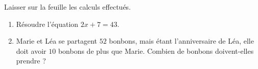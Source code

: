 
\begin{exercice}\label{exo2smath-0304}

    Laisser sur la feuille les calculs effectués.
    \begin{enumerate}
        \item
            Résoudre l'équation \( 2x+7=43\).
        \item
            Marie et Léa se partagent \( 52\) bonbons, mais étant l'anniversaire de Léa, elle doit avoir \( 10\) bonbons de plus que Marie. Combien de bonbons doivent-elles prendre ?
    \end{enumerate}

\end{exercice}
